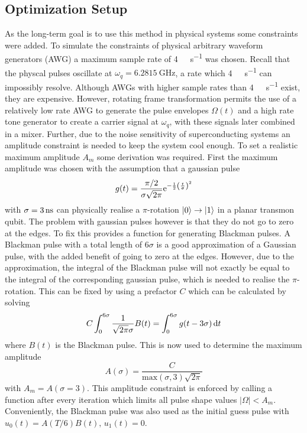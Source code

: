 \documentclass[main.tex]{subfiles}
\begin{document}
\subsection{Optimization Setup}
As the long-term goal is to use this method in physical systems some constraints were added.
To simulate the constraints of physical arbitrary waveform generators (AWG) a maximum sample rate of \SI{4}{\giga\samples\per\second} was chosen.
Recall that the physcal pulses oscillate at \( \omega_{q} = \SI{6.2815}{\giga\hertz} \), a rate which \SI{4}{\giga\samples\per\second} can impossibly resolve.
Although AWGs with higher sample rates than \SI{4}{\giga\samples\per\second} exist, they are expensive.
However, rotating frame transformation permits the use of a relatively low rate AWG to generate the pulse envelopes \( \Omega(t) \) and a high rate tone generator to create a carrier signal at \( \omega_{q} \), with these signals later combined in a mixer.
Further, due to the noise sensitivity of superconducting systems an amplitude constraint is needed to keep the system cool enough.
To set a realistic maximum amplitude \( A_m \) some derivation was required.
First the maximum amplitude was chosen with the assumption that a gaussian pulse
\begin{equation}
    g(t) = \frac{\pi/2}{\sigma\sqrt{2\pi}} \mathrm{e}^{-\frac{1}{2}\qty(\frac{t}{\sigma})^2}
\end{equation}
with \( \sigma = \SI{3}{\nano\second} \) can physically realise a \(\pi\)-rotation \( \ket{0} \rightarrow \ket{1} \) in a planar transmon qubit.
The problem with gaussian pulses however is that they do not go to zero at the edges.
To fix this \krotov{} provides a function for generating Blackman pulses.
A Blackman pulse with a total length of \(6\sigma\) is a good approximation of a Gaussian pulse, with the added benefit of going to zero at the edges.
However, due to the approximation, the integral of the Blackman pulse will not exactly be equal to the integral of the corresponding gaussian pulse, which is needed to realise the \(\pi\)-rotation.
This can be fixed by using a prefactor \(C\) which can be calculated by solving
\begin{equation}
    C \int_0^{6\sigma}\frac{1}{\sqrt{2\pi}\sigma} B(t) = \int_0^{6\sigma}g(t-3\sigma)\,\mathrm{d} t
\end{equation}
where \(B(t)\) is the Blackman pulse.
This is now used to determine the maximum amplitude
\begin{equation}
    A(\sigma) = \frac{C}{\text{max}(\sigma,3)\sqrt{2\pi}}
\end{equation}
with \(A_m = A(\sigma = 3)\). 
This amplitude constraint is enforced by calling a function after every iteration which limits all pulse shape values \(|\Omega| < A_m\).
Conveniently, the Blackman pulse was also used as the initial guess pulse with \(u_0(t) = A(T/6)B(t),\, u_1(t)=0\).
\end{document}
